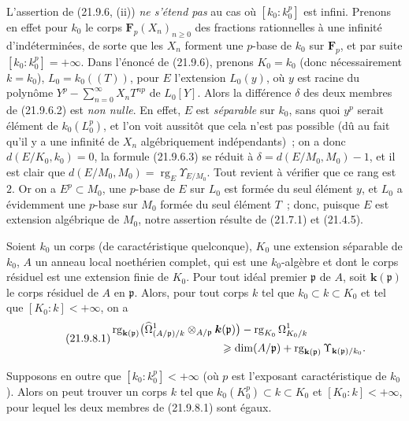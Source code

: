 \begin{remark}[21.9.7]
\label{0.21.9.7-fr}
L'assertion de (21.9.6, (ii)) \emph{ne s'étend pas} au cas où
$[k_0:k_0^p]$ est infini. Prenons en effet pour $k_0$ le corps
$\mathbf F_p(X_n)_{n\geqslant0}$ des fractions rationnelles à une infinité
d'indéterminées, de sorte que les $X_n$ forment une $p$-base de $k_0$ sur
$\mathbf F_p$, et par suite $[k_0:k_0^p]=+\infty$. Dans l'énoncé de (21.9.6),
prenons $K_0=k_0$ (donc nécessairement $k=k_0$), $L_0=k_0((T))$, pour $E$
l'extension $L_0(y)$, où $y$ est racine du polynôme $Y^p-\sum_{n=0}^{\infty}X_nT^{np}$
de $L_0[Y]$. Alors la différence $\delta$ des deux membres de (21.9.6.2) est
\emph{non nulle}. En effet, $E$ est \emph{séparable} sur $k_0$, sans quoi
$y^p$ serait élément de $k_0(L_0^p)$, et l'on voit aussitôt que cela n'est
pas possible (dû au fait qu'il y a une infinité de $X_n$ algébriquement
indépendants)~; on a donc $d(E/K_0,k_0)=0$, la formule (21.9.6.3) se réduit à
$\delta=d(E/M_0,M_0)-1$, et il est clair que
$d(E/M_0,M_0)=\operatorname{rg}_E\Upsilon_{E/M_0}$. Tout revient à vérifier
que ce rang est $2$. Or on a $E^p\subset M_0$, une $p$-base de $E$ sur $L_0$
est formée du seul élément $y$, et $L_0$ a évidemment une $p$-base sur $M_0$
formée du seul élément $T$~; donc, puisque $E$ est extension algébrique de
$M_0$, notre assertion résulte de (21.7.1) et (21.4.5).
\end{remark}

\begin{proposition}[21.9.8]
\label{0.21.9.8-fr}
Soient $k_0$ un corps (de caractéristique quelconque), $K_0$ une extension
séparable de $k_0$, $A$ un anneau local noethérien complet, qui est une
$k_0$-algèbre et dont le corps résiduel
est une extension finie de $K_0$. Pour tout idéal premier $\mathfrak p$ de
$A$, soit $\boldsymbol{k}(\mathfrak p)$ le corps résiduel de $A$ en $\mathfrak p$. Alors,
pour tout corps $k$ tel que $k_0\subset k\subset K_0$ et tel que
$[K_0:k]<+\infty$, on a
\begin{equation}
\tag{21.9.8.1}
\label{0.21.9.8.1-fr}
\begin{split}
  &\operatorname{rg}_{\mathbf{k}(\mathfrak p)}
    \bigl(\widehat\Omega^1_{(A/\mathfrak p)/k}
      \otimes_{A/\mathfrak p}\boldsymbol{k}(\mathfrak p)\bigr)
    -\operatorname{rg}_{K_0}\Omega^1_{K_0/k}\\
  &\hspace{35mm}\geqslant
    \dim(A/\mathfrak p)
    +\operatorname{rg}_{\mathbf{k}(\mathfrak p)}\Upsilon_{\mathbf{k}(\mathfrak p)/k_0}.
\end{split}
\end{equation}

Supposons en outre que $[k_0:k_0^p]<+\infty$ (où $p$ est l'exposant
caractéristique de $k_0$). Alors on peut trouver un corps $k$ tel que
$k_0(K_0^p)\subset k\subset K_0$ et $[K_0:k]<+\infty$, pour lequel les deux
membres de \textup{(21.9.8.1)} sont égaux.
\end{proposition}


